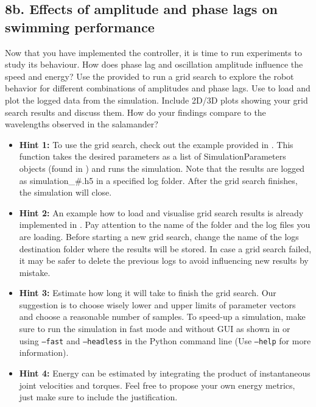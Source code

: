 \documentclass{cmc}
\begin{document}


\subsection*{8b. Effects of amplitude and phase lags on swimming
  performance}
\label{sec:amplitude-phase-performance}

Now that you have implemented the controller, it is time to run experiments to
study its behaviour. How does phase lag and oscillation amplitude influence the
speed and energy? Use the provided  to run a grid search
to explore the robot behavior for different combinations of amplitudes and phase
lags. Use  to load and plot the logged data from the
simulation. Include 2D/3D plots showing your grid search results and discuss
them. How do your findings compare to the wavelengths observed in the
salamander?


\begin{itemize}
\item \textbf{Hint 1:} To use the grid search, check out the example provided in
  . This function takes the desired parameters as a
  list of SimulationParameters objects (found in
  ) and runs the simulation. Note that the
  results are logged as simulation\_\#.h5 in a specified log folder. After the
  grid search finishes, the simulation will close.
\item \textbf{Hint 2:} An example how to load and visualise grid search results
  is already implemented in . Pay attention to
  the name of the folder and the log files you are loading. Before starting a
  new grid search, change the name of the logs destination folder where the
  results will be stored. In case a grid search failed, it may be safer to
  delete the previous logs to avoid influencing new results by mistake.
\item \textbf{Hint 3:} Estimate how long it will take to finish the grid
  search. Our suggestion is to choose wisely lower and upper limits of parameter
  vectors and choose a reasonable number of samples. To speed-up a simulation,
  make sure to run the simulation in fast mode and without GUI as shown in
   or using \texttt{--fast} and \texttt{--headless}
  in the Python command line (Use \texttt{--help} for more information).
\item \textbf{Hint 4:} Energy can be estimated by integrating the product of
  instantaneous joint velocities and torques. Feel free to propose your own
  energy metrics, just make sure to include the justification.
\end{itemize}
\end{document}

